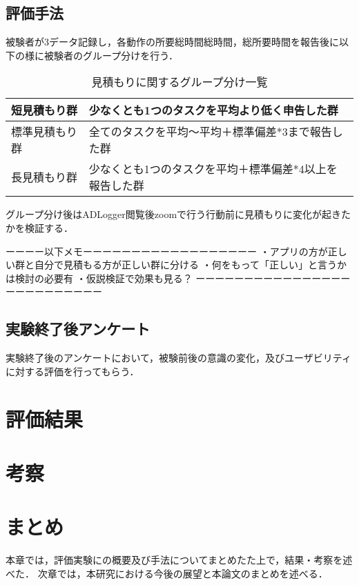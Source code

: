 \subsection{評価手法}
被験者が3データ記録し，各動作の所要総時間総時間，総所要時間を報告後に以下の様に被験者のグループ分けを行う．
\begin{table}[htb]
\begin{center}
  \begin{tabular}{|l|l|} \hline
   短見積もり群 & 少なくとも1つのタスクを平均より低く申告した群 \\ \hline
   標準見積もり群 & 全てのタスクを平均〜平均＋標準偏差*3まで報告した群\\ \hline
   長見積もり群 & 少なくとも1つのタスクを平均＋標準偏差*4以上を報告した群 \\ \hline
  \end{tabular}
  \caption{見積もりに関するグループ分け一覧}
  \label{tb:Lakein}
\end{center}
\end{table}
グループ分け後はADLogger閲覧後zoomで行う行動前に見積もりに変化が起きたかを検証する．

ーーーー以下メモーーーーーーーーーーーーーーーーーー
・アプリの方が正しい群と自分で見積もる方が正しい群に分ける
・何をもって「正しい」と言うかは検討の必要有
・仮説検証で効果も見る？
ーーーーーーーーーーーーーーーーーーーーーーーーーー

\subsection{実験終了後アンケート}
実験終了後のアンケートにおいて，被験前後の意識の変化，及びユーザビリティに対する評価を行ってもらう．%

\section{評価結果}

\section{考察}

\section{まとめ}
本章では，評価実験にの概要及び手法についてまとめたた上で，結果・考察を述べた．
次章では，本研究における今後の展望と本論文のまとめを述べる．

